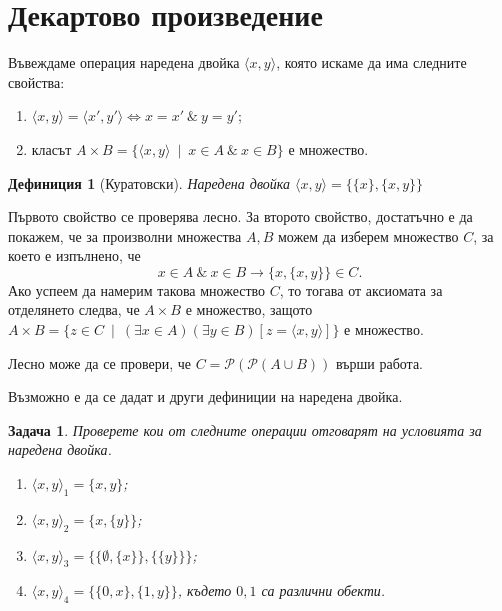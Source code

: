 \documentclass[a4paper]{article}
\newtheorem{dfn}{Дефиниция}
\newtheorem{problem}{Задача}
\newcommand{\Ps}{\mathscr{P}}
\begin{document}
\author{Stefan Vatev}


\section{Декартово произведение}
  Въвеждаме операция наредена двойка $\langle{x,y}\rangle$, която искаме да има следните свойства:
  \begin{enumerate}
  \item
    $\langle{x,y}\rangle = \langle{x',y'}\rangle \iff x = x' \ \&\ y = y'$;
  \item
    класът $A\times B = \{\langle{x,y}\rangle\ \mid\ x\in A\ \&\ x\in B\}$ е множество.
\end{enumerate}


\begin{dfn}[Куратовски]
  Наредена двойка $\langle{x,y}\rangle = \{\{x\},\{x,y\}\}$
\end{dfn}

Първото свойство се проверява лесно.
За второто свойство, достатъчно е да покажем, че за произволни множества $A,B$ можем да 
изберем множество $C$, за което е изпълнено, че
\[x\in A\ \&\ x\in B \rightarrow \{x,\{x,y\}\}\in C.\]
Ако успеем да намерим такова множество $C$, то тогава от аксиомата за отделянето следва, че $A\times B$
е множество, защото $A\times B = \{ z\in C\ \mid\ (\exists x\in A)(\exists y\in B)[z = \langle{x,y}\rangle]\}$ е множество.

Лесно може да се провери, че $C = \Ps(\Ps(A\cup B))$ върши работа.

Възможно е да се дадат и други дефиниции на наредена двойка.
\begin{problem}
  Проверете кои от следните операции отговарят на условията за наредена двойка.
  \begin{enumerate}
  \item
    $\langle{x,y}\rangle_{1} = \{x,y\}$;
  \item
    $\langle{x,y}\rangle_{2} = \{x,\{y\}\}$;
  \item
    $\langle{x,y}\rangle_{3} = \{\{\emptyset,\{x\}\},\{\{y\}\}\}$;
  \item
    $\langle{x,y}\rangle_{4} = \{\{0,x\},\{1,y\}\}$, 
    където $0,1$ са различни обекти.
\end{enumerate}
\end{problem}
\end{document}
